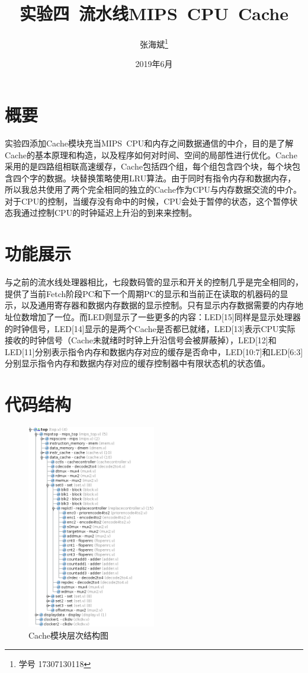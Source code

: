 \documentclass[12pt,a4paper]{article}
\title{实验四~流水线MIPS~CPU~Cache}
\author{张海斌\thanks{学号 17307130118}}
\begin{document}
\date{2019年6月}

\maketitle

\renewcommand\contentsname{目~录}
\tableofcontents

\section{概要}

实验四添加Cache模块充当MIPS~CPU和内存之间数据通信的中介，目的是了解Cache的基本原理和构造，以及程序如何对时间、空间的局部性进行优化。Cache采用的是四路组相联高速缓存，Cache包括四个组，每个组包含四个块，每个块包含四个字的数据。块替换策略使用LRU算法。由于同时有指令内存和数据内存，所以我总共使用了两个完全相同的独立的Cache作为CPU与内存数据交流的中介。对于CPU的控制，当缓存没有命中的时候，CPU会处于暂停的状态，这个暂停状态我通过控制CPU的时钟延迟上升沿的到来来控制。

\section{功能展示}

与之前的流水线处理器相比，七段数码管的显示和开关的控制几乎是完全相同的，提供了当前Fetch阶段PC和下一个周期PC的显示和当前正在读取的机器码的显示，以及通用寄存器和数据内存数据的显示控制。只有显示内存数据需要的内存地址位数增加了一位。而LED则显示了一些更多的内容：LED[15]同样是显示处理器的时钟信号，LED[14]显示的是两个Cache是否都已就绪，LED[13]表示CPU实际接收的时钟信号（Cache未就绪时时钟上升沿信号会被屏蔽掉），LED[12]和LED[11]分别表示指令内存和数据内存对应的缓存是否命中，LED[10:7]和LED[6:3]分别显示指令内存和数据内存对应的缓存控制器中有限状态机的状态值。

\section{代码结构}

\begin{figure}[htb]
	\centering
	\includegraphics[width=0.5\textwidth]{cache-struct}
	\caption{Cache模块层次结构图}
	\label{fig:struct}
\end{figure}
\end{document}

